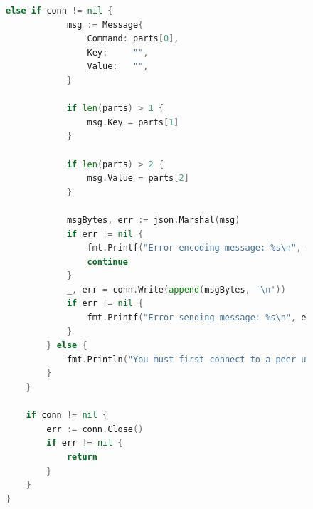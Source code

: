 \documentclass[a4paper, 14pt]{extarticle}
\begin{document}
\newpage

\begin{figure}[!htb]
\begin{lstlisting}[language={Go},caption={acces.go - продолжение},label={lst:code2}]
else if conn != nil {
			msg := Message{
				Command: parts[0],
				Key:     "",
				Value:   "",
			}

			if len(parts) > 1 {
				msg.Key = parts[1]
			}

			if len(parts) > 2 {
				msg.Value = parts[2]
			}

			msgBytes, err := json.Marshal(msg)
			if err != nil {
				fmt.Printf("Error encoding message: %s\n", err)
				continue
			}
			_, err = conn.Write(append(msgBytes, '\n'))
			if err != nil {
				fmt.Printf("Error sending message: %s\n", err)
			}
		} else {
			fmt.Println("You must first connect to a peer using 'PEER <port>'")
		}
	}

	if conn != nil {
		err := conn.Close()
		if err != nil {
			return
		}
	}
}

\end{lstlisting}
\end{figure}
\end{document}
